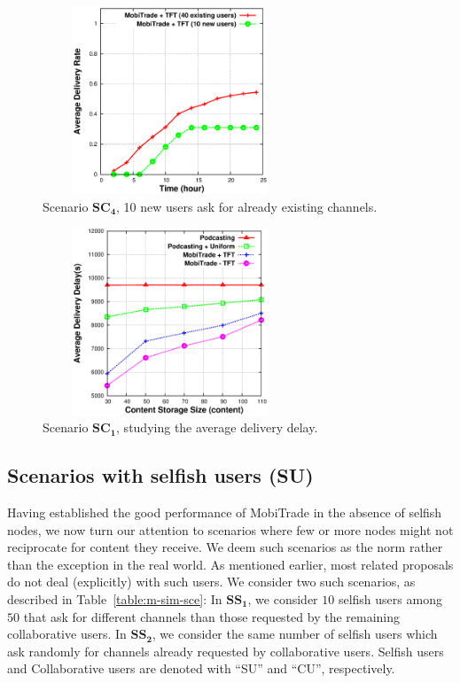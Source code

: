 \begin{figure}[!h]
  \begin{center}
    \includegraphics[width=3in,height=2.2in]{Chapitre5/fig8.eps}
  \end{center}
  \caption{Scenario $\mathbf{SC_4}$, 10 new users ask for already existing channels.}
  \label{10-new-users}
\end{figure}

\begin{figure}[!h]
  \begin{center}
    \includegraphics[width=3in,height=2.2in]{Chapitre5/fig12.eps}
  \end{center}
  \caption{Scenario $\mathbf{SC_1}$, studying the average delivery delay.}
  \label{avg-delay}
\end{figure}

\subsection{Scenarios with selfish users (SU)}
\label{selfish-scenario}

Having established the good performance of MobiTrade in the absence of selfish nodes, we now turn our attention to scenarios where few or more nodes might not reciprocate for content they receive. We deem such scenarios as the norm rather than the exception in the real world. As mentioned earlier, most related proposals do not deal (explicitly) with such users. We consider two such scenarios, as described in Table~\ref{table:m-sim-sce}: In $\mathbf{SS_{1}}$, we consider $10$ selfish users among $50$ that ask for different channels than those requested by the remaining collaborative users. In $\mathbf{SS_{2}}$, we consider the same number of selfish users which ask randomly for channels already requested by collaborative users. Selfish users and Collaborative users are denoted with ``SU'' and ``CU'', respectively.

